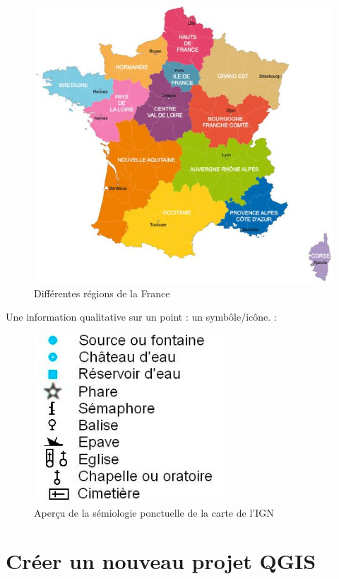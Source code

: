 \begin{figure}
\centering
\includegraphics{figures/examples_regions.jpg}
\caption{Différentes régions de la France}
\end{figure}

Une information qualitative sur un point : un symbôle/icône. :

\begin{figure}
\centering
\includegraphics{figures/examples_ponctuel_ign.png}
\caption{Aperçu de la sémiologie ponctuelle de la carte de l'IGN}
\end{figure}

\hypertarget{cruxe9er-un-nouveau-projet-qgis}{%
\section{Créer un nouveau projet
QGIS}\label{cruxe9er-un-nouveau-projet-qgis}}

